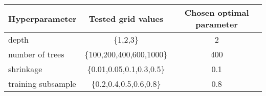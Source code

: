 \begin{tabular}{l|c|c|}
    Hyperparameter     & Tested grid values       & Chosen optimal parameter \\
    \hline 
    depth              & \{1,2,3\}                  & 2    \\
    number of trees    & \{100,200,400,600,1000\} & 400  \\
    shrinkage          & \{0.01,0.05,0.1,0.3,0.5\}          & 0.1  \\
    training subsample & \{0.2,0.4,0.5,0.6,0.8\}  & 0.8  \\
\end{tabular}
